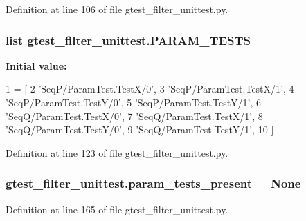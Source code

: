 Definition at line 106 of file gtest\+\_\+filter\+\_\+unittest.\+py.

\subsubsection[{\texorpdfstring{P\+A\+R\+A\+M\+\_\+\+T\+E\+S\+TS}{PARAM_TESTS}}]{\setlength{\rightskip}{0pt plus 5cm}list gtest\+\_\+filter\+\_\+unittest.\+P\+A\+R\+A\+M\+\_\+\+T\+E\+S\+TS}\hypertarget{namespacegtest__filter__unittest_a4c414863f1e2e9ac993ce4afda33f6b9}{}\label{namespacegtest__filter__unittest_a4c414863f1e2e9ac993ce4afda33f6b9}
{\bfseries Initial value\+:}
\begin{DoxyCode}
1 = [
2     \textcolor{stringliteral}{'SeqP/ParamTest.TestX/0'},
3     \textcolor{stringliteral}{'SeqP/ParamTest.TestX/1'},
4     \textcolor{stringliteral}{'SeqP/ParamTest.TestY/0'},
5     \textcolor{stringliteral}{'SeqP/ParamTest.TestY/1'},
6     \textcolor{stringliteral}{'SeqQ/ParamTest.TestX/0'},
7     \textcolor{stringliteral}{'SeqQ/ParamTest.TestX/1'},
8     \textcolor{stringliteral}{'SeqQ/ParamTest.TestY/0'},
9     \textcolor{stringliteral}{'SeqQ/ParamTest.TestY/1'},
10     ]
\end{DoxyCode}


Definition at line 123 of file gtest\+\_\+filter\+\_\+unittest.\+py.

\subsubsection[{\texorpdfstring{param\+\_\+tests\+\_\+present}{param_tests_present}}]{\setlength{\rightskip}{0pt plus 5cm}gtest\+\_\+filter\+\_\+unittest.\+param\+\_\+tests\+\_\+present = None}\hypertarget{namespacegtest__filter__unittest_aab31f58fd88fa64c14e6ab5dc5fb8da3}{}\label{namespacegtest__filter__unittest_aab31f58fd88fa64c14e6ab5dc5fb8da3}


Definition at line 165 of file gtest\+\_\+filter\+\_\+unittest.\+py.


